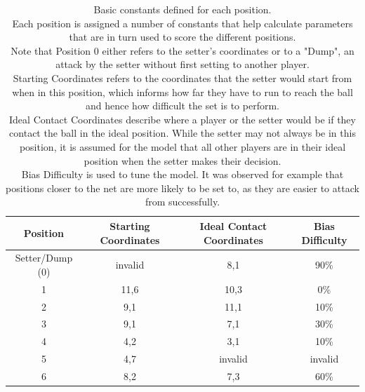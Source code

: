 \documentclass[main.tex]{subfiles}
\begin{document}
      \begin{table}[h!]
        \label{tab:positions}
        \centering
        \caption{Basic constants defined for each position. \\
          Each position is assigned a number of constants that help calculate parameters that are in turn used to score the different positions. \\
          Note that Position 0 either refers to the setter's coordinates or to a "Dump", an attack by the setter without first setting to another player. \\
          Starting Coordinates refers to the coordinates that the setter would start from when in this position, which informs how far they have to run to reach the ball and hence how difficult the set is to perform. \\
          Ideal Contact Coordinates describe where a player or the setter would be if they contact the ball in the ideal position. While the setter may not always be in this position, it is assumed for the model that all other players are in their ideal position when the setter makes their decision. \\
          Bias Difficulty is used to tune the model. It was observed for example that positions closer to the net are more likely to be set to, as they are easier to attack from successfully.}
        \begin{tabular}{ c | c c c }
          \hline
          Position & Starting Coordinates & Ideal Contact Coordinates & Bias Difficulty \\ \hline \hline
          Setter/Dump (0) &  invalid & 8,1 & 90\% \\
          1 & 11,6 & 10,3 & 0\% \\
          2 & 9,1 & 11,1 & 10\% \\
          3 & 9,1 & 7,1 & 30\% \\
          4 & 4,2 & 3,1 & 10\% \\
          5 & 4,7 & invalid & invalid \\
          6 & 8,2 & 7,3 & 60\% \\
          \hline
        \end{tabular}
      \end{table}
\end{document}
